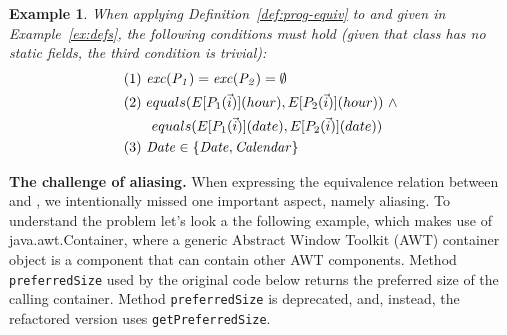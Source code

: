 \documentclass[conference]{IEEEtran}
\newtheorem{example}{Example}
\begin{document}
\begin{example}\label{ex:equiv}
  When applying Definition~\ref{def:prog-equiv} to  and  given in Example~\ref{ex:defs},
  the following conditions must hold (given that class  has no static fields, the third condition is trivial):
\[
\begin{aligned}
      & (1)~ \var{exc(P_1)}=\var{exc(P_2)} =\emptyset\\
      & (2)~ equals(E[P_1(\vec{i})](hour), E[P_2(\vec{i})](hour)) ~ \wedge\\ %
      & \qquad equals(E[P_1(\vec{i})](date), E[P_2(\vec{i})](date))\\
& (3)~  \var{Date} \in \{\var{Date}, \var{Calendar}\}
    \end{aligned}
    \]

 
    
\end{example}


{\bf The challenge of aliasing.}
%
When expressing the equivalence relation between  and , we
intentionally missed one important aspect, namely aliasing.  To understand
the problem let's look a the following example, which makes use of
java.awt.Container, where a generic Abstract Window Toolkit (AWT) container
object is a component that can contain other AWT components.  Method
\lstinline[breaklines=true]{preferredSize} used by the original code below returns the preferred
size of the calling container. Method
\lstinline[breaklines=true]{preferredSize} is deprecated, and, instead, the refactored version
uses \lstinline[breaklines=true]{getPreferredSize}.

\end{document}

